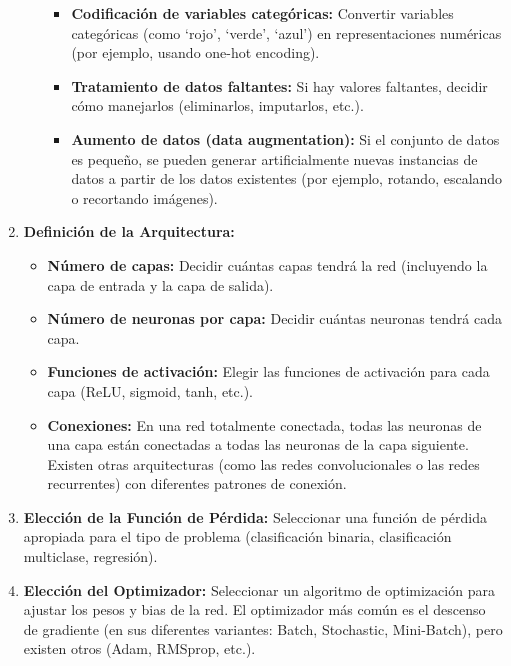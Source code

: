 \documentclass{article}
\begin{document}
\begin{enumerate}
\begin{itemize}
\begin{itemize}
                    \item \textbf{Codificación de variables categóricas:} Convertir variables categóricas (como `rojo', `verde', `azul') en representaciones numéricas (por ejemplo, usando one-hot encoding).
                    \item \textbf{Tratamiento de datos faltantes:} Si hay valores faltantes, decidir cómo manejarlos (eliminarlos, imputarlos, etc.).
                    \item \textbf{Aumento de datos (data augmentation):}  Si el conjunto de datos es pequeño, se pueden generar artificialmente nuevas instancias de datos a partir de los datos existentes (por ejemplo, rotando, escalando o recortando imágenes).
                \end{itemize}
        \end{itemize}

    \item \textbf{Definición de la Arquitectura:}
        \begin{itemize}
            \item \textbf{Número de capas:} Decidir cuántas capas tendrá la red (incluyendo la capa de entrada y la capa de salida).
            \item \textbf{Número de neuronas por capa:} Decidir cuántas neuronas tendrá cada capa.
            \item \textbf{Funciones de activación:} Elegir las funciones de activación para cada capa (ReLU, sigmoid, tanh, etc.).
            \item \textbf{Conexiones:}  En una red totalmente conectada, todas las neuronas de una capa están conectadas a todas las neuronas de la capa siguiente.  Existen otras arquitecturas (como las redes convolucionales o las redes recurrentes) con diferentes patrones de conexión.
        \end{itemize}

    \item \textbf{Elección de la Función de Pérdida:} Seleccionar una función de pérdida apropiada para el tipo de problema (clasificación binaria, clasificación multiclase, regresión).

    \item \textbf{Elección del Optimizador:} Seleccionar un algoritmo de optimización para ajustar los pesos y bias de la red.  El optimizador más común es el descenso de gradiente (en sus diferentes variantes: Batch, Stochastic, Mini-Batch), pero existen otros (Adam, RMSprop, etc.).

\end{enumerate}
\end{document}
